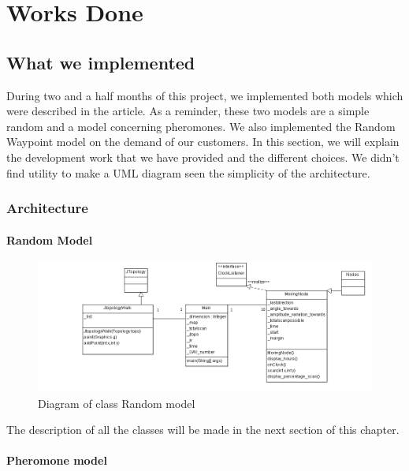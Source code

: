 \chapter{Works Done}

\section{What we implemented}

During two and a half months of this project, we implemented both models which were described in the article. As a reminder, these two models are a simple random and a model concerning pheromones. We also implemented the Random Waypoint model on the demand of our customers. In this section, we will explain the development work that we have provided and the different choices. We didn't find utility to make a UML diagram seen the simplicity of the architecture.

\subsection{Architecture}

\subsubsection{Random Model}

\begin{figure}[h]
\center
\includegraphics[scale=0.7]{../images/DiagrammedeclassesRandom.png}
\caption{\label{RandomWalkDIA}Diagram of class Random model}
\end{figure}

The description of all the classes will be made in the next section of this chapter.

\subsubsection{Pheromone model}

